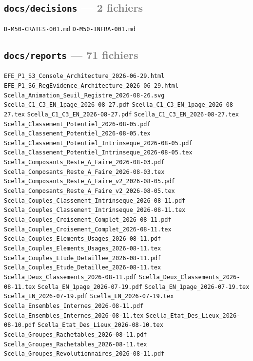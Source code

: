 \documentclass[10pt]{report}
\newcommand{\code}[1]{\texttt{\small #1}}
\begin{document}
\subsection*{\code{docs/decisions} \normalfont\textcolor{grey}{--- 2 fichiers}}
\begin{sloppypar}\footnotesize\raggedright
\code{D-M50-CRATES-001.md} \;\textbullet\; \code{D-M50-INFRA-001.md}
\end{sloppypar}

\subsection*{\code{docs/reports} \normalfont\textcolor{grey}{--- 71 fichiers}}
\begin{sloppypar}\footnotesize\raggedright
\code{EFE\_P1\_S3\_Console\_Architecture\_2026-06-29.html} \;\textbullet\; \code{EFE\_P1\_S6\_RegEvidence\_Architecture\_2026-06-29.html} \;\textbullet\; \code{Scella\_Animation\_Seuil\_Registre\_2026-08-26.svg} \;\textbullet\; \code{Scella\_C1\_C3\_EN\_1page\_2026-08-27.pdf} \;\textbullet\; \code{Scella\_C1\_C3\_EN\_1page\_2026-08-27.tex} \;\textbullet\; \code{Scella\_C1\_C3\_EN\_2026-08-27.pdf} \;\textbullet\; \code{Scella\_C1\_C3\_EN\_2026-08-27.tex} \;\textbullet\; \code{Scella\_Classement\_Potentiel\_2026-08-05.pdf} \;\textbullet\; \code{Scella\_Classement\_Potentiel\_2026-08-05.tex} \;\textbullet\; \code{Scella\_Classement\_Potentiel\_Intrinseque\_2026-08-05.pdf} \;\textbullet\; \code{Scella\_Classement\_Potentiel\_Intrinseque\_2026-08-05.tex} \;\textbullet\; \code{Scella\_Composants\_Reste\_A\_Faire\_2026-08-03.pdf} \;\textbullet\; \code{Scella\_Composants\_Reste\_A\_Faire\_2026-08-03.tex} \;\textbullet\; \code{Scella\_Composants\_Reste\_A\_Faire\_v2\_2026-08-05.pdf} \;\textbullet\; \code{Scella\_Composants\_Reste\_A\_Faire\_v2\_2026-08-05.tex} \;\textbullet\; \code{Scella\_Couples\_Classement\_Intrinseque\_2026-08-11.pdf} \;\textbullet\; \code{Scella\_Couples\_Classement\_Intrinseque\_2026-08-11.tex} \;\textbullet\; \code{Scella\_Couples\_Croisement\_Complet\_2026-08-11.pdf} \;\textbullet\; \code{Scella\_Couples\_Croisement\_Complet\_2026-08-11.tex} \;\textbullet\; \code{Scella\_Couples\_Elements\_Usages\_2026-08-11.pdf} \;\textbullet\; \code{Scella\_Couples\_Elements\_Usages\_2026-08-11.tex} \;\textbullet\; \code{Scella\_Couples\_Etude\_Detaillee\_2026-08-11.pdf} \;\textbullet\; \code{Scella\_Couples\_Etude\_Detaillee\_2026-08-11.tex} \;\textbullet\; \code{Scella\_Deux\_Classements\_2026-08-11.pdf} \;\textbullet\; \code{Scella\_Deux\_Classements\_2026-08-11.tex} \;\textbullet\; \code{Scella\_EN\_1page\_2026-07-19.pdf} \;\textbullet\; \code{Scella\_EN\_1page\_2026-07-19.tex} \;\textbullet\; \code{Scella\_EN\_2026-07-19.pdf} \;\textbullet\; \code{Scella\_EN\_2026-07-19.tex} \;\textbullet\; \code{Scella\_Ensembles\_Internes\_2026-08-11.pdf} \;\textbullet\; \code{Scella\_Ensembles\_Internes\_2026-08-11.tex} \;\textbullet\; \code{Scella\_Etat\_Des\_Lieux\_2026-08-10.pdf} \;\textbullet\; \code{Scella\_Etat\_Des\_Lieux\_2026-08-10.tex} \;\textbullet\; \code{Scella\_Groupes\_Rachetables\_2026-08-11.pdf} \;\textbullet\; \code{Scella\_Groupes\_Rachetables\_2026-08-11.tex} \;\textbullet\; \code{Scella\_Groupes\_Revolutionnaires\_2026-08-11.pdf} \;\textbullet\; 
\end{sloppypar}
\end{document}
